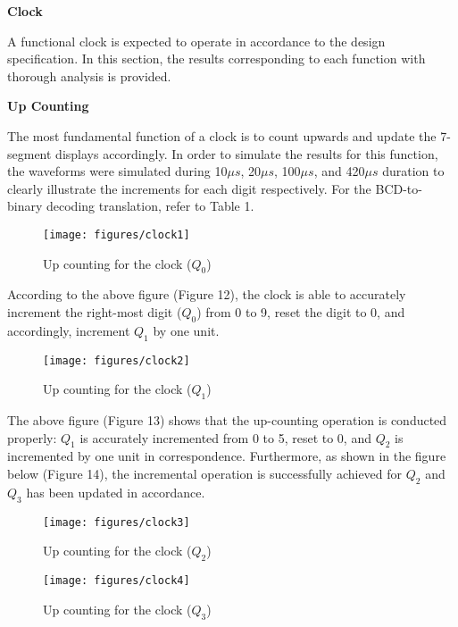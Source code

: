 \documentclass[12pt,a4paper]{article}
\begin{document}
	\vspace{0.4cm}
	\noindent \textbf{\large Clock}
	\vspace{0.2cm}
	
	\noindent A functional clock is expected to operate in accordance to the design specification. In this section, the results corresponding to each function with thorough analysis is provided.
	
	\vspace{0.2cm}
	\noindent \textbf{Up Counting}
	\vspace{0.2cm}
	
	\noindent The most fundamental function of a clock is to count upwards and update the 7-segment displays accordingly. In order to simulate the results for this function, the waveforms were simulated during 10$\mu s$, 20$\mu s$, 100$\mu s$, and 420$\mu s$ duration to clearly illustrate the increments for each digit respectively. For the BCD-to-binary decoding translation, refer to Table 1. 
	
	\begin{figure}[H]
		\centering
		\texttt{[image: figures/clock1]}
		\caption{Up counting for the clock ($Q_{0}$)}
	\end{figure}
	
	\noindent According to the above figure (Figure 12), the clock is able to accurately increment the right-most digit ($Q_{0}$) from 0 to 9, reset the digit to 0, and accordingly, increment $Q_{1}$ by one unit. 

	\begin{figure}[H]
		\centering
		\texttt{[image: figures/clock2]}
		\caption{Up counting for the clock ($Q_{1}$)}
	\end{figure}

	\noindent The above figure (Figure 13) shows that the up-counting operation is conducted properly: $Q_{1}$ is accurately incremented from 0 to 5, reset to 0, and $Q_{2}$ is incremented by one unit in correspondence. Furthermore, as shown in the figure below (Figure 14), the incremental operation is successfully achieved for $Q_{2}$ and $Q_{3}$ has been updated in accordance.
	
	\begin{figure}[H]
		\centering
		\texttt{[image: figures/clock3]}
		\caption{Up counting for the clock ($Q_{2}$)}
	\end{figure}

	\begin{figure}[H]
		\centering
		\texttt{[image: figures/clock4]}
		\caption{Up counting for the clock ($Q_{3}$)}
	\end{figure}
	
\end{document}
